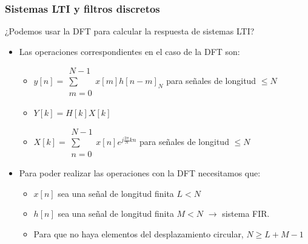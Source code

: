 \documentclass{beamer}
\numberwithin{section}{part}
\begin{document}
\begin{frame}
    \frametitle{Sistemas LTI y filtros discretos}
    
    \footnotesize
    \alert{¿Podemos usar la DFT para calcular la respuesta de sistemas LTI?}
  \begin{itemize}
    \item Las operaciones correspondientes en el caso de la DFT son:
    \begin{itemize}
    \footnotesize
    \item $y[n]=\substack{N-1\\\sum\\m=0} x[m]h[n-m]_N$ para señales de longitud $\le N$
    \vspace{0.1cm}
    
    \item $Y[k]=H[k]X[k]$
    \vspace{0.1cm}
    \item $X[k]=\substack{N-1\\\sum\\n=0} x[n]e^{j\frac{2\pi}{N}kn}$ para señales de longitud $\le N$
    \end{itemize}
    \item Para poder realizar las operaciones con la DFT necesitamos que:  
    \begin{itemize}
      \footnotesize
      \item $x[n]$ sea una señal de longitud finita $L< N$
      \item $h[n]$ sea una señal de longitud finita $M < N$  $\rightarrow $ sistema FIR.
      \item Para que no haya elementos del desplazamiento circular, $N \ge L+M-1$
    \end{itemize}
  \end{itemize}
\end{frame}
  
\end{document}
